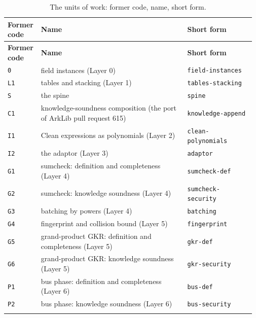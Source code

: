 {\footnotesize\setlength{\tabcolsep}{3pt}
\begin{longtable}{@{}>{\raggedright\arraybackslash}p{0.116\linewidth}>{\raggedright\arraybackslash}p{0.582\linewidth}>{\raggedright\arraybackslash}p{0.271\linewidth}@{}}
\caption{The units of work: former code, name, short form.}\label{tab:docs-map-units}\\
\toprule
\textbf{Former code} & \textbf{Name} & \textbf{Short form} \\
\midrule
\endfirsthead
\toprule
\textbf{Former code} & \textbf{Name} & \textbf{Short form} \\
\midrule
\endhead
\bottomrule
\endfoot
\texttt{0} & field instances (Layer 0) & \texttt{field-\allowbreak{}instances} \\\addlinespace[2pt]
\texttt{L1} & tables and stacking (Layer 1) & \texttt{tables-\allowbreak{}stacking} \\\addlinespace[2pt]
\texttt{S} & the spine & \texttt{spine} \\\addlinespace[2pt]
\texttt{C1} & knowledge-soundness composition (the port of ArkLib pull request 615) & \texttt{knowledge-\allowbreak{}append} \\\addlinespace[2pt]
\texttt{I1} & Clean expressions as polynomials (Layer 2) & \texttt{clean-\allowbreak{}polynomials} \\\addlinespace[2pt]
\texttt{I2} & the adaptor (Layer 3) & \texttt{adaptor} \\\addlinespace[2pt]
\texttt{G1} & sumcheck: definition and completeness (Layer 4) & \texttt{sumcheck-\allowbreak{}def} \\\addlinespace[2pt]
\texttt{G2} & sumcheck: knowledge soundness (Layer 4) & \texttt{sumcheck-\allowbreak{}security} \\\addlinespace[2pt]
\texttt{G3} & batching by powers (Layer 4) & \texttt{batching} \\\addlinespace[2pt]
\texttt{G4} & fingerprint and collision bound (Layer 5) & \texttt{fingerprint} \\\addlinespace[2pt]
\texttt{G5} & grand-product GKR: definition and completeness (Layer 5) & \texttt{gkr-\allowbreak{}def} \\\addlinespace[2pt]
\texttt{G6} & grand-product GKR: knowledge soundness (Layer 5) & \texttt{gkr-\allowbreak{}security} \\\addlinespace[2pt]
\texttt{P1} & bus phase: definition and completeness (Layer 6) & \texttt{bus-\allowbreak{}def} \\\addlinespace[2pt]
\texttt{P2} & bus phase: knowledge soundness (Layer 6) & \texttt{bus-\allowbreak{}security} \\\addlinespace[2pt]

\end{longtable}}
